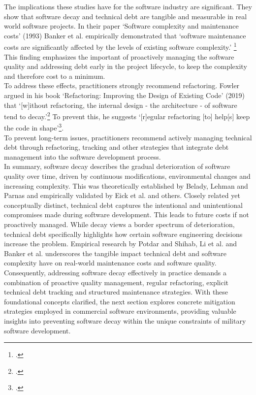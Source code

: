 The implications these studies have for the software industry are significant. They show that software decay and technical debt are tangible and measurable in real world software projects.
In their paper `Software complexity and maintenance costs' (1993) Banker et al. empirically demonstrated that `software maintenance costs are significantly affected by the levels of existing software complexity.' \footcite[12]{bankerSoftwareComplexityMaintenance1993}
This finding emphasizes the important of proactively managing the software quality and addressing debt early in the project lifecycle, to keep the complexity and therefore cost to a minimum.\\
To address these effects, practitioners strongly recommend refactoring. Fowler argued in his book `Refactoring: Improving the Design of Existing Code' (2019)
that `[w]ithout refactoring, the internal design - the architecture - of software tend to decay.'\footcite[58]{fowlerRefactoringImprovingDesign2019}
To prevent this, he suggests `[r]egular refactoring [to] help[s] keep the code in shape'\footcite[58]{fowlerRefactoringImprovingDesign2019}.\\
To prevent long-term issues, practitioners recommend actively managing technical debt through refactoring, tracking and other strategies 
that integrate debt management into the software development process.\\

In summary, software decay describes the gradual deterioration of software quality over time, driven by continuous modifications, environmental changes and increasing complexity. This was theoretically established by Belady, Lehman and Parnas and empirically validated by Eick et al. and others.
Closely related yet conceptually distinct, technical debt captures the intentional and unintentional compromises made during software development. This leads to future costs if not proactively managed.
While decay views a border spectrum of deterioration, technical debt specifically highlights how certain software engineering decisions increase the problem. 
Empirical research by Potdar and Shihab, Li et al. and Banker et al. underscores the tangible impact technical debt and software complexity have on real-world maintenance costs and software quality.
Consequently, addressing software decay effectively in practice demands a combination of proactive quality management, regular refactoring, explicit technical debt tracking and structured maintenance strategies.
With these foundational concepts clarified, the next section explores concrete mitigation strategies employed in commercial software environments, providing valuable insights into preventing software decay within the unique constraints of military software development.



